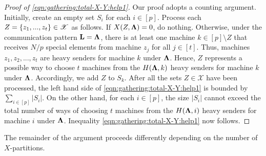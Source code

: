\documentclass[sigconf]{acmart}
\def\vgap{\vspace{0mm}}
\def\XX{\mathscr{X}}
\begin{document}
\begin{proof}[Proof of \eqref{eqn:gathering:total-X-Y:help1}]
    Our proof adopts a counting argument. Initially, create an empty set $S_i$ for each $i \in [p]$. Process each $Z = \set{z_1, ..., z_t} \in \XX$ as follows. If $X(Z, \mathbf{\Lambda}) = 0$, do nothing. Otherwise, under the communication pattern $\mathbf{L} = \textrm{\boldmath${\Lambda}$}$, there is at least one machine $k \in [p] \setminus Z$ that receives $N/p$ special elements from machine $z_j$ for all $j \in [t]$. Thus, machines $z_1, z_2, ..., z_t$ are heavy senders for machine $k$ under $\mathbf{\Lambda}$. Hence, $Z$ represents a possible way to choose $t$ machines from the $H(\mathbf{\Lambda}, k)$ heavy senders for machine $k$ under $\mathbf{\Lambda}$. Accordingly, we add $Z$ to $S_k$. After all the sets $Z \in \XX$ have been processed, the left hand side of \eqref{eqn:gathering:total-X-Y:help1} is bounded by $\sum_{i \in [p]} |S_i|$. On the other hand, for each $i \in [p]$, the size $|S_i|$ cannot exceed the total number of ways of choosing $t$ machines from the $H(\mathbf{\Lambda}, i)$ heavy senders for machine $i$ under $\mathbf{\Lambda}$. Inequality \eqref{eqn:gathering:total-X-Y:help1} now follows.
\end{proof}


\vgap

The remainder of the argument proceeds differently depending on the number of $X$-partitions.
\end{document}
